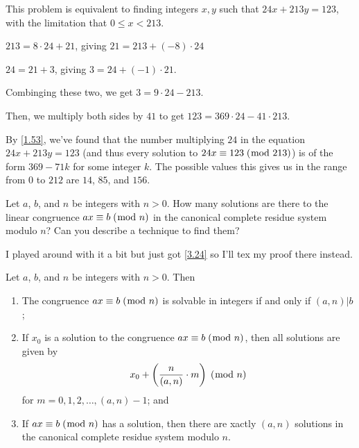 \documentclass[../main.tex]{subfiles}
\begin{document}
This problem is equivalent to finding integers $x, y$ such that $24x + 213y = 123$, with the limitation that $0 \leq x < 213$.

$213 = 8 \cdot 24 + 21$, giving $21 = 213 + (-8) \cdot 24$

$24 = 21 + 3$, giving $3 = 24 + (-1) \cdot 21$.

Combinging these two, we get $3 = 9 \cdot 24 - 213$.

Then, we multiply both sides by $41$ to get $123 = 369 \cdot 24 - 41 \cdot 213$.

By \ref{1.53}, we've found that the number multiplying $24$ in the equation $24x + 213y = 123$ (and thus every solution to $24x \equiv 123 \; (\bmod \; 213)$) is of the form $369 - 71k$ for some integer $k$. The possible values this gives us in the range from $0$ to $212$ are $14$, $85$, and $156$.



\begin{ques} \label{3.23}
  Let $a$, $b$, and $n$ be integers with $n > 0$. How many solutions are there to the linear congruence $ax \equiv b \; (\bmod \; n)$ in the canonical complete residue system modulo $n$? Can you describe a technique to find them?
\end{ques}

I played around with it a bit but just got \ref{3.24} so I'll tex my proof there instead.



\begin{thm} \label{3.24}
  Let $a$, $b$, and $n$ be integers with $n > 0$. Then

  \begin{enumerate}
    \item The congruence $ax \equiv b \; (\bmod \; n)$ is solvable in integers if and only if $(a, n) | b$;
    \item If $x_0$ is a solution to the congruence $ax \equiv b \; (\bmod \; n)$, then all solutions are given by $$x_0 + \left( \frac{n}{(a,n)} \cdot m \right) \; (\bmod \; n)$$ for $m = 0, 1, 2, \ldots, (a,n) - 1$; and
    \item If $ax \equiv b \; (\bmod \; n)$ has a solution, then there are xactly $(a, n)$ solutions in the canonical complete residue system modulo $n$.
  \end{enumerate}
\end{thm}
\end{document}

